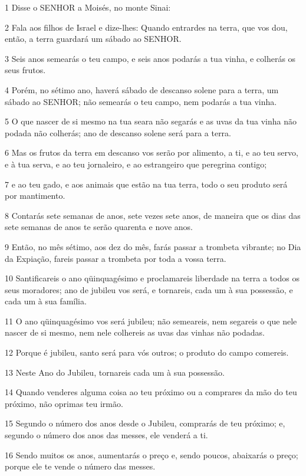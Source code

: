 \par 1 Disse o SENHOR a Moisés, no monte Sinai:
\par 2 Fala aos filhos de Israel e dize-lhes: Quando entrardes na terra, que vos dou, então, a terra guardará um sábado ao SENHOR.
\par 3 Seis anos semearás o teu campo, e seis anos podarás a tua vinha, e colherás os seus frutos.
\par 4 Porém, no sétimo ano, haverá sábado de descanso solene para a terra, um sábado ao SENHOR; não semearás o teu campo, nem podarás a tua vinha.
\par 5 O que nascer de si mesmo na tua seara não segarás e as uvas da tua vinha não podada não colherás; ano de descanso solene será para a terra.
\par 6 Mas os frutos da terra em descanso vos serão por alimento, a ti, e ao teu servo, e à tua serva, e ao teu jornaleiro, e ao estrangeiro que peregrina contigo;
\par 7 e ao teu gado, e aos animais que estão na tua terra, todo o seu produto será por mantimento.
\par 8 Contarás sete semanas de anos, sete vezes sete anos, de maneira que os dias das sete semanas de anos te serão quarenta e nove anos.
\par 9 Então, no mês sétimo, aos dez do mês, farás passar a trombeta vibrante; no Dia da Expiação, fareis passar a trombeta por toda a vossa terra.
\par 10 Santificareis o ano qüinquagésimo e proclamareis liberdade na terra a todos os seus moradores; ano de jubileu vos será, e tornareis, cada um à sua possessão, e cada um à sua família.
\par 11 O ano qüinquagésimo vos será jubileu; não semeareis, nem segareis o que nele nascer de si mesmo, nem nele colhereis as uvas das vinhas não podadas.
\par 12 Porque é jubileu, santo será para vós outros; o produto do campo comereis.
\par 13 Neste Ano do Jubileu, tornareis cada um à sua possessão.
\par 14 Quando venderes alguma coisa ao teu próximo ou a comprares da mão do teu próximo, não oprimas teu irmão.
\par 15 Segundo o número dos anos desde o Jubileu, comprarás de teu próximo; e, segundo o número dos anos das messes, ele venderá a ti.
\par 16 Sendo muitos os anos, aumentarás o preço e, sendo poucos, abaixarás o preço; porque ele te vende o número das messes.
